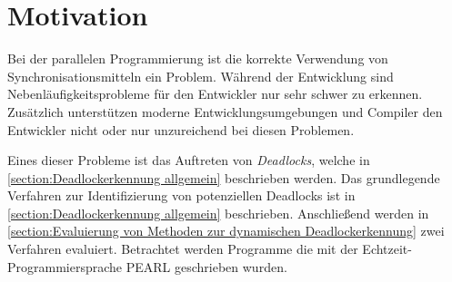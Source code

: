\section{Motivation}

Bei der parallelen Programmierung ist die korrekte Verwendung von
Synchronisationsmitteln ein Problem. Während der Entwicklung sind
Nebenläufigkeitsprobleme für den Entwickler nur sehr schwer zu erkennen.
Zusätzlich unterstützen moderne Entwicklungsumgebungen und Compiler den
Entwickler nicht oder nur unzureichend bei diesen Problemen.

Eines dieser Probleme ist das Auftreten von \textit{Deadlocks}, welche in
\cref{section:Deadlockerkennung allgemein} beschrieben werden.
Das grundlegende Verfahren zur Identifizierung von potenziellen Deadlocks
ist in \cref{section:Deadlockerkennung allgemein} beschrieben. Anschließend
werden in \cref{section:Evaluierung von Methoden zur dynamischen
Deadlockerkennung} zwei Verfahren evaluiert. Betrachtet werden Programme die mit
der Echtzeit-Programmiersprache PEARL\autocite{PEARL} geschrieben wurden.
